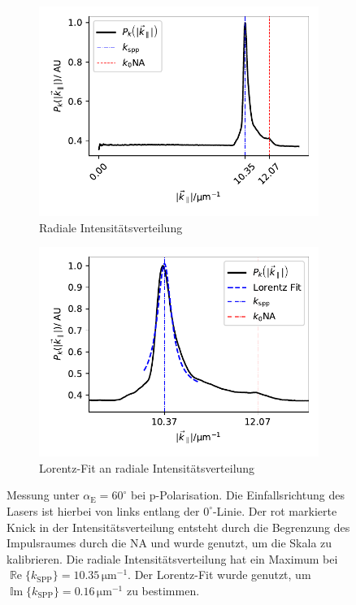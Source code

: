 \documentclass[a4paper, titlepage,  ngerman]{book}
\renewcommand{\Re}{\operatorname{\mathbb{R}e}}
\renewcommand{\Im}{\operatorname{\mathbb{I}m}}
\begin{document}
\begin{figure}
\begin{subfigure}{0.5\textwidth}
				\includegraphics[width=\textwidth]{figures/new/4_1_radial_int.pdf}
				\caption{Radiale Intensitätsverteilung}
				\label{fig:radial_profile}			
			\end{subfigure}
			\hfill
			\begin{subfigure}{0.49\textwidth}
				\centering
				\includegraphics[width=\textwidth]{figures/new/4_1_lorenz_profile.pdf}
				\caption{Lorentz-Fit an radiale Intensitätsverteilung}
				\label{fig:lorenz_profile}			
			\end{subfigure}
	
		\caption[Messwerte bei linearer Polarisation]{Messung unter $\alpha_{\mathrm{E}} = 60^\circ$ bei p-Polarisation. Die Einfallsrichtung des Lasers ist hierbei von links entlang der $0^\circ$-Linie. Der rot markierte Knick in der Intensitätsverteilung entsteht durch die Begrenzung des Impulsraumes durch die NA und wurde genutzt, um die Skala zu kalibrieren. Die radiale Intensitätsverteilung  hat ein Maximum bei $\Re\{k_{\mathrm{SPP}}\}= 10.35\,\mathrm{\mu m ^{-1}}$. Der Lorentz-Fit  wurde genutzt, um $\Im\{k_{\mathrm{SPP}}\}= 0.16\,\mathrm{\mu m ^{-1}}$ zu bestimmen.}
		\label{fig:example_measure}			
	\end{figure}
\end{document}
